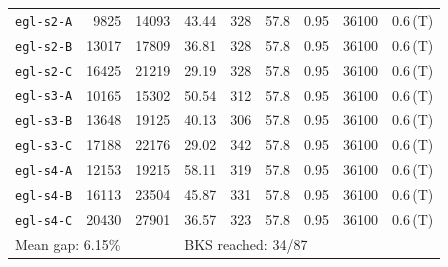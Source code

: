 \begin{longtable}{lrrrrrrrl}
\texttt{egl-s2-A} & 9825 & 14093 & 43.44 & 328 & 57.8 & 0.95 & 36100 & 0.6\,(T) \\
\texttt{egl-s2-B} & 13017 & 17809 & 36.81 & 328 & 57.8 & 0.95 & 36100 & 0.6\,(T) \\
\texttt{egl-s2-C} & 16425 & 21219 & 29.19 & 328 & 57.8 & 0.95 & 36100 & 0.6\,(T) \\
\texttt{egl-s3-A} & 10165 & 15302 & 50.54 & 312 & 57.8 & 0.95 & 36100 & 0.6\,(T) \\
\texttt{egl-s3-B} & 13648 & 19125 & 40.13 & 306 & 57.8 & 0.95 & 36100 & 0.6\,(T) \\
\texttt{egl-s3-C} & 17188 & 22176 & 29.02 & 342 & 57.8 & 0.95 & 36100 & 0.6\,(T) \\
\texttt{egl-s4-A} & 12153 & 19215 & 58.11 & 319 & 57.8 & 0.95 & 36100 & 0.6\,(T) \\
\texttt{egl-s4-B} & 16113 & 23504 & 45.87 & 331 & 57.8 & 0.95 & 36100 & 0.6\,(T) \\
\texttt{egl-s4-C} & 20430 & 27901 & 36.57 & 323 & 57.8 & 0.95 & 36100 & 0.6\,(T) \\
\midrule
\multicolumn{3}{l}{Mean gap: 6.15\%} & \multicolumn{6}{l}{BKS reached: 34/87} \\
\end{longtable}
\endgroup